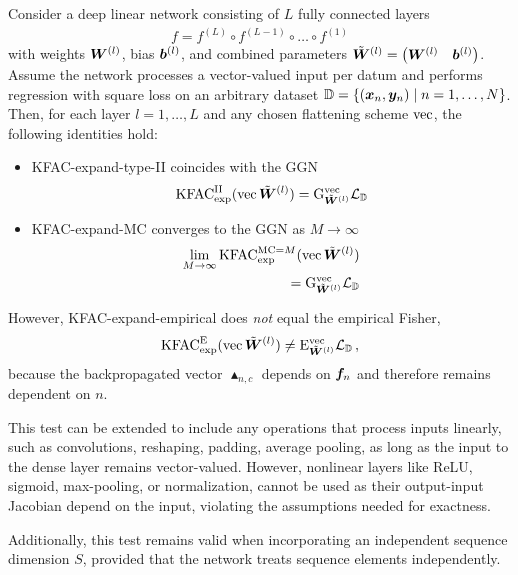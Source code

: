 \begin{test}
Consider a deep linear network consisting of $L$ fully connected layers
\begin{align*}
  f = f^{(L)} \circ f^{(L-1)} \circ \ldots \circ f^{(1)}
\end{align*}
with weights $\mW^{(l)}$, bias $\vb^{(l)}$, and combined parameters $\tilde{\mW}^{(l)} = \begin{pmatrix} \mW^{(l)} & \vb^{(l)} \end{pmatrix}$.
Assume the network processes a vector-valued input per datum and performs regression with square loss on an arbitrary dataset $\sD = \{ (\vx_n, \vy_n) \mid n = 1, \dots, N \}$.
Then, for each layer $l=1,\dots,L$ and any chosen flattening scheme $\vec$, the following identities hold:
\begin{itemize}
\item KFAC-expand-type-II coincides with the GGN
  \begin{align*}
    \kfac^{\text{II}}_{\text{exp}}(\vec \tilde{\mW}^{(l)})
    =
    \ggn^{\vec}_{\tilde{\mW}^{(l)}} \gL_{\sD}
  \end{align*}
\item KFAC-expand-MC converges to the GGN as $M\rightarrow\infty$
  \begin{align*}
    \lim_{M \to \infty} \kfac^{\text{MC}=M}_{\text{exp}}(\vec \tilde{\mW}^{(l)})
    \\=
    \ggn^{\vec}_{\tilde{\mW}^{(l)}} \gL_{\sD}
  \end{align*}

\end{itemize}
However, KFAC-expand-empirical does \emph{not} equal the empirical Fisher,
\begin{align*}
  \kfac_{\text{exp}}^{\text{E}}(\vec \tilde{\mW}^{(l)})
  \neq
  \ef^{\vec}_{\tilde{\mW}^{(l)}} \gL_{\sD}\,,
\end{align*}
because the backpropagated vector $\blacktriangle_{n,c}$ depends on $\vf_n$ and therefore remains dependent on $n$.
\end{test}
This test can be extended to include any operations that process inputs linearly, such as convolutions, reshaping, padding, average pooling, as long as the input to the dense layer remains vector-valued.
However, nonlinear layers like ReLU, sigmoid, max-pooling, or normalization, cannot be used as their output-input Jacobian depend on the input, violating the assumptions needed for exactness.

Additionally, this test remains valid when incorporating an independent sequence dimension $S$, provided that the network treats sequence elements independently.

